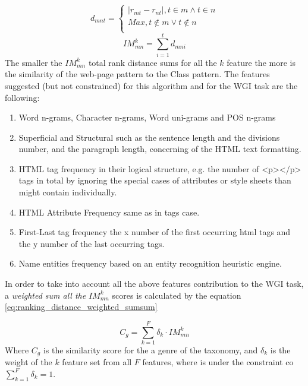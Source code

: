\begin{equation}\label{eq:ranking_distance}
	d_{mnt} =
      \begin{cases}
      	| r_{mt} - r_{nt} |, t \in m \wedge t \in n  \\
        Max, t \notin m \vee t \notin n \\ 
       \end{cases}
\end{equation}
\begin{equation}\label{eq:ranking_distance_sum}
	IM_{mn}^{k} = \sum_{i=1}^{t} d_{mni}
\end{equation}
The smaller the $IM^{k}_{mn}$ total rank distance sums for all the $k$ feature the more is the similarity of the web-page pattern to the Class pattern. The features suggested (but not constrained) for this algorithm and for the WGI task are the following:

\begin{enumerate}
\item Word n-grams, Character n-grams, Word uni-grams and POS n-grams
\item Superficial and Structural such as the sentence length and the divisions number, and the paragraph length, concerning of the HTML text formatting.
\item HTML tag frequency in their logical structure, e.g. the number of <p></p> tags in total by ignoring the special cases of attributes or style sheets than might contain individually.
\item HTML Attribute Frequency same as in tags case.
\item First-Last tag frequency the x number of  the first occurring html tags and the y number of the last occurring tags.
\item Name entities frequency based on an entity recognition heuristic engine.
\end{enumerate}

In order to take into account all the above features contribution to the WGI task, a \textit{weighted sum all the} $IM^{k}_{mn}$ scores is calculated by the equation \ref{eq:ranking_distance_weighted_sumsum}

\begin{equation}\label{eq:ranking_distance_weighted_sumsum}
	C_{g} = \sum_{k=1}^{F} \delta_{k} \cdot IM_{mn}^{k}
\end{equation}
Where $C_{g}$ is the similarity score for the a genre of the taxonomy, and $\delta_{k}$ is the weight of the $k$ feature set from all $F$ features, where is under the constraint co $\sum_{k=1}^{F} \delta_{k} = 1$.

